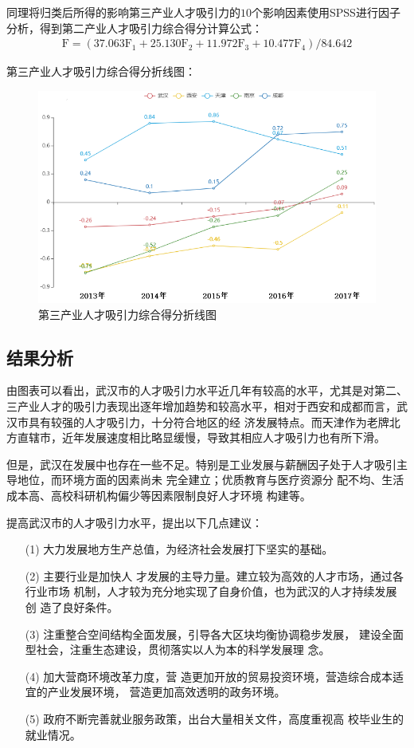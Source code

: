\documentclass{whutmod}
\begin{document}
\begin{itemize}
	同理将归类后所得的影响第三产业人才吸引力的$10$个影响因素使用SPSS进行因子分析，得到第二产业人才吸引力综合得分计算公式：
	\begin{gather}
	\mathrm { F } = \left( 37.063 \mathrm { F } _ { 1 } + 25.130 \mathrm { F } _ { 2 } + 11.972 \mathrm { F } _ { 3 } + 10.477 \mathrm { F } _ { 4 } \right) / 84.642
	\end{gather}

	第三产业人才吸引力综合得分折线图：
		\begin{figure}[H]
		\centering
		\includegraphics[width=\textwidth]{figures/33.png}
		\caption{第三产业人才吸引力综合得分折线图}\label{33}
	\end{figure}


	\subsection{结果分析}
	由图表可以看出，武汉市的人才吸引力水平近几年有较高的水平，尤其是对第二、三产业人才的吸引力表现出逐年增加趋势和较高水平，相对于西安和成都而言，武汉市具有较强的人才吸引力，十分符合地区的经
	济发展特点。而天津作为老牌北方直辖市，近年发展速度相比略显缓慢，导致其相应人才吸引力也有所下滑。
	
	但是，武汉在发展中也存在一些不足。特别是工业发展与薪酬因子处于人才吸引主导地位，而环境方面的因素尚未
	完全建立；优质教育与医疗资源分
	配不均、生活成本高、高校科研机构偏少等因素限制良好人才环境
	构建等。
	
	提高武汉市的人才吸引力水平，提出以下几点建议：
\begin{itemize}
	\item [(1)] 大力发展地方生产总值，为经济社会发展打下坚实的基础。
	\item [(2)]主要行业是加快人
	才发展的主导力量。建立较为高效的人才市场，通过各行业市场
	机制，人才较为充分地实现了自身价值，也为武汉的人才持续发展创
	造了良好条件。
	\item [(3)]注重整合空间结构全面发展，引导各大区块均衡协调稳步发展，
	建设全面型社会，注重生态建设，贯彻落实以人为本的科学发展理
	念。
	\item [(4)]加大营商环境改革力度，营
	造更加开放的贸易投资环境，营造综合成本适宜的产业发展环境，
	营造更加高效透明的政务环境。
	\item [(5)]政府不断完善就业服务政策，出台大量相关文件，高度重视高
	校毕业生的就业情况。
\end{itemize}


\end{itemize}
\end{document}
